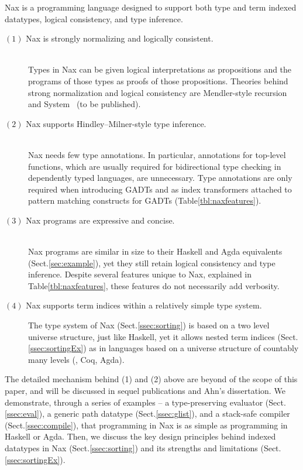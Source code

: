 Nax is a programming language designed to support both type and
term indexed datatypes,
logical consistency, and type inference.
\begin{description}
\item[$(1)$ Nax is strongly normalizing and logically consistent.]~\\
Types in Nax can be given logical interpretations as propositions
and the programs of those types as proofs of those propositions.
Theories behind strong normalization and logical consistency are
Mendler-style recursion \cite{AhnShe11} and System \Fi\ (to be published).

\item[$(2)$ Nax supports Hindley--Milner-style type inference.]~\\
Nax needs few type annotations. In particular,
annotations for top-level functions, which are usually
required for bidirectional type checking in dependently typed languages,
are unnecessary.
Type annotations are only required when introducing GADTs and as
index transformers attached to pattern matching constructs for GADTs
(Table\;\ref{tbl:naxfeatures}).

\item[$(3)$ Nax programs are expressive and concise.]~\\
Nax programs are similar in size to their Haskell and Agda equivalents
(Sect.\;\ref{sec:example}), yet they still retain logical consistency
and type inference. Despite several features unique to Nax,
explained in Table\;\ref{tbl:naxfeatures}, these features
do not necessarily add verbosity.

\item[$(4)$ Nax supports term indices within a relatively simple type system.]
The type system of Nax (Sect.\;\ref{ssec:sorting}) is based on a
two level universe structure, just like Haskell, yet it allows nested term indices
(Sect.\;\ref{ssec:sortingEx}) as in languages
based on a universe structure of countably many levels (\eg, Coq, Agda).
\end{description}

The detailed mechanism behind (1) and (2) above are beyond of the scope of
this paper, and will be discussed in sequel publications and Ahn's dissertation.
We demonstrate, through a series of examples -- a type-preserving evaluator (Sect.\;\ref{ssec:eval}),
a generic path datatype (Sect.\;\ref{ssec:glist}), and
a stack-safe compiler (Sect.\;\ref{ssec:compile}), that programming in Nax 
is as simple as programming in Haskell or Agda.
Then, we discuss the key design principles behind indexed datatypes in Nax
(Sect.\;\ref{ssec:sorting}) and its strengths and limitations
(Sect.\;\ref{ssec:sortingEx}).

